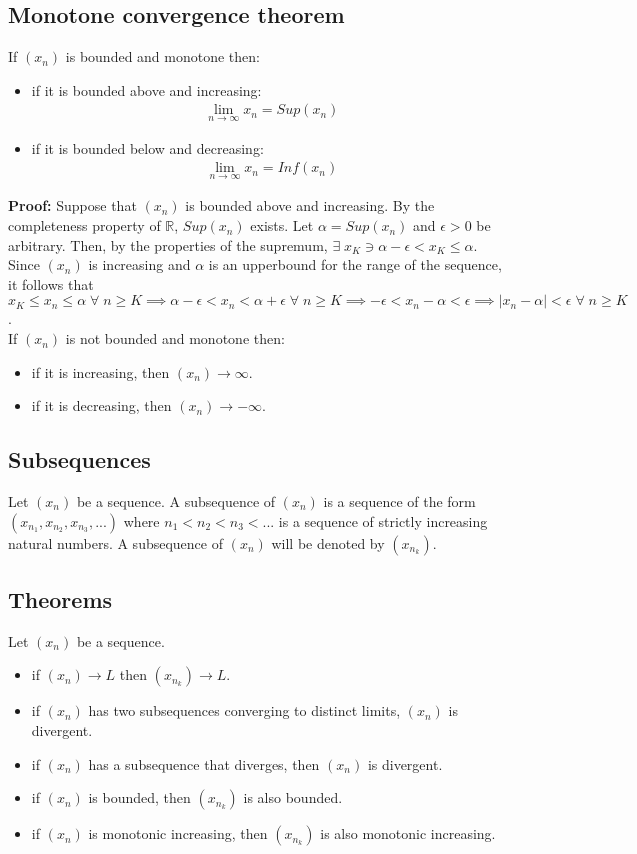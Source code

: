 \documentclass[12pt, a4paper]{article}
\newcommand{\real}{\mathbb{R}}
\newcommand{\all}{\; \forall \;}
\begin{document}
\subsection{Monotone convergence theorem}
If $(x_n)$ is bounded and monotone then:
\begin{itemize}
  \item if it is bounded above and increasing: 
    \begin{gather*}
      \lim_{n \to \infty} x_n = Sup(x_n)
  \end{gather*}
  \item if it is bounded below and decreasing: 
    \begin{gather*}
      \lim_{n \to \infty} x_n = Inf(x_n)
    \end{gather*}
\end{itemize}

\textbf{Proof:} Suppose that $(x_n)$ is bounded above and increasing. 
By the completeness property of $\real$, $Sup(x_n)$ exists. Let $\alpha = Sup(x_n)$
and $\epsilon > 0$ be arbitrary. Then, by the properties of the supremum,
$\exists \; x_K \ni \alpha - \epsilon < x_K \leq \alpha$. Since $(x_n)$
is increasing and $\alpha$ is an upperbound for the range of the sequence,
it follows that $x_K \leq x_n \leq \alpha \all n \geq K \implies
\alpha - \epsilon < x_n < \alpha + \epsilon \all n \geq K \implies 
-\epsilon < x_n - \alpha < \epsilon \implies |x_n - \alpha| < \epsilon
\all n \geq K$.\\

If $(x_n)$ is not bounded and monotone then:
\begin{itemize}
  \item if it is increasing, then $(x_n) \to \infty$.
  \item if it is decreasing, then $(x_n) \to -\infty$.
\end{itemize}

\subsection{Subsequences}
Let $(x_n)$ be a sequence. A subsequence of $(x_n)$ is a sequence of the
form $(x_{n_1}, x_{n_2}, x_{n_3}, ...)$ where $n_1 < n_2 < n_3 < ...$ is
a sequence of strictly increasing natural numbers. A subsequence of $(x_n)$
will be denoted by $(x_{n_k})$.

\subsection{Theorems}
Let $(x_n)$ be a sequence.
\begin{itemize}
  \item if $(x_n) \to L$ then $(x_{n_k}) \to L$.
  \item if $(x_n)$ has two subsequences converging to distinct limits,
    $(x_n)$ is divergent.
  \item if $(x_n)$ has a subsequence that diverges, then $(x_n)$ is divergent.
  \item if $(x_n)$ is bounded, then $(x_{n_k})$ is also bounded.
  \item if $(x_n)$ is monotonic increasing, then $(x_{n_k})$ is also monotonic
    increasing.
\end{itemize}
\end{document}
